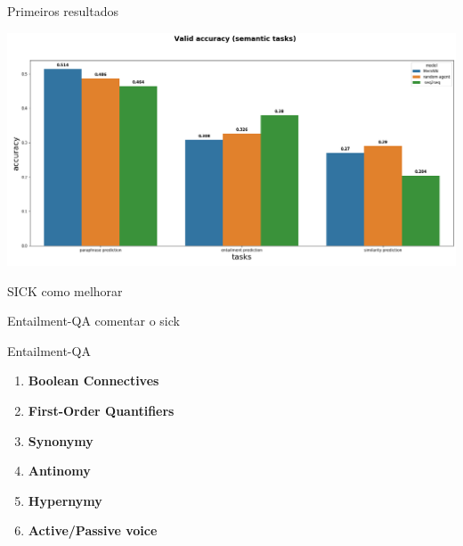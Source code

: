 \documentclass[10pt]{beamer}
\begin{document}
\begin{frame}{Primeiros resultados}
\begin{center}
\includegraphics[scale=0.28]{images/both_semantic_tasks.png}
\end{center}
\end{frame}

\begin{frame}{SICK como melhorar}

\end{frame}


\begin{frame}{Entailment-QA}
comentar o sick

\end{frame}


\begin{frame}{Entailment-QA}

\begin{enumerate}
\item \textbf{Boolean Connectives}
\item \textbf{First-Order Quantifiers}
\item \textbf{Synonymy}
\item \textbf{Antinomy}
\item \textbf{Hypernymy}
\item \textbf{Active/Passive voice}
\end{enumerate}
\end{frame}
\end{document}
